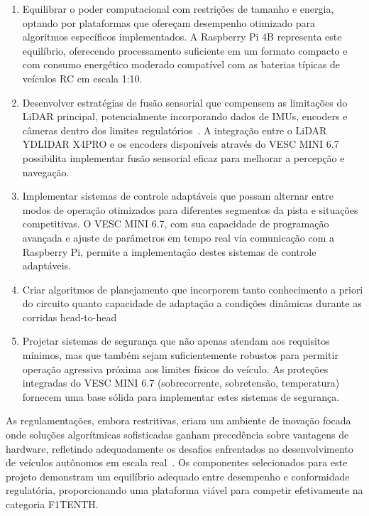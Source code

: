 \begin{enumerate}
      \item Equilibrar o poder computacional com restrições de tamanho e energia, optando
            por plataformas que ofereçam desempenho otimizado para algoritmos específicos
            implementados. A Raspberry Pi 4B representa este equilíbrio, oferecendo
            processamento suficiente em um formato compacto e com consumo energético
            moderado compatível com as baterias típicas de veículos RC em escala 1:10.

      \item Desenvolver estratégias de fusão sensorial que compensem as limitações do LiDAR
            principal, potencialmente incorporando dados de IMUs, encoders e câmeras dentro
            dos limites regulatórios~\cite{YangF1TENTH2022}. A integração entre o LiDAR
            YDLIDAR X4PRO e os encoders disponíveis através do VESC MINI 6.7 possibilita
            implementar fusão sensorial eficaz para melhorar a percepção e navegação.

      \item Implementar sistemas de controle adaptáveis que possam alternar entre modos de
            operação otimizados para diferentes segmentos da pista e situações
            competitivas. O VESC MINI 6.7, com sua capacidade de programação avançada e
            ajuste de parâmetros em tempo real via comunicação com a Raspberry Pi, permite
            a implementação destes sistemas de controle adaptáveis.

      \item Criar algoritmos de planejamento que incorporem tanto conhecimento a priori do
            circuito quanto capacidade de adaptação a condições dinâmicas durante as
            corridas head-to-head~\cite{MoralesF1TENTH2021}

      \item Projetar sistemas de segurança que não apenas atendam aos requisitos mínimos,
            mas que também sejam suficientemente robustos para permitir operação agressiva
            próxima aos limites físicos do veículo. As proteções integradas do VESC MINI
            6.7 (sobrecorrente, sobretensão, temperatura) fornecem uma base sólida para
            implementar estes sistemas de segurança.
\end{enumerate}

As regulamentações, embora restritivas, criam um ambiente de inovação focada
onde soluções algorítmicas sofisticadas ganham precedência sobre vantagens de
hardware, refletindo adequadamente os desafios enfrentados no desenvolvimento
de veículos autônomos em escala real~\cite{OKelly2020F1TENTH}. Os componentes
selecionados para este projeto demonstram um equilíbrio adequado entre
desempenho e conformidade regulatória, proporcionando uma plataforma viável
para competir efetivamente na categoria F1TENTH.